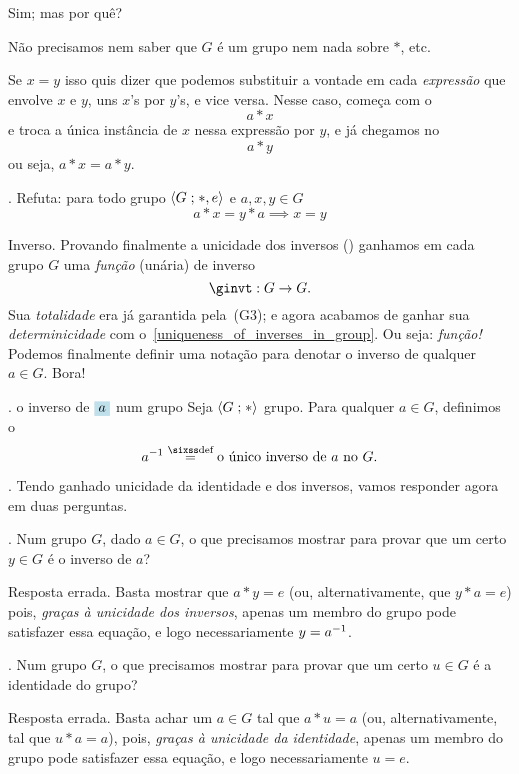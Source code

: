 \hint
Sim; mas por quê?

\hint
Não precisamos nem saber que $G$ é um grupo nem nada sobre $\ast$, etc.

\solution
Se $x=y$ isso quis dizer que podemos substituir a vontade em cada
\emph{expressão} que envolve $x$ e $y$, uns $x$'s por $y$'s, e vice versa.
Nesse caso, começa com o
$$
a \ast x
$$
e troca a única instância de $x$ nessa expressão por $y$, e já chegamos no
$$
a \ast y
$$
ou seja, $a \ast x = a \ast y$.

\endexercise

\exercise.
Refuta: para todo grupo $\langle{G}\mathrel{;}{\ast, e}\rangle$ e $a,x,y\in G$
$$
a\ast x = y\ast a \implies x=y
$$

\endexercise

\note Inverso.
\label{ginv_is_a_function}%
Provando finalmente a unicidade dos inversos
() ganhamos em cada grupo $G$ uma
\emph{função} (unária) de inverso
$$
\ginvt : G \to G.
$$
Sua \emph{totalidade} era já garantida pela~(G3);
e agora acabamos de ganhar sua \emph{determinicidade} com
o~\ref{uniqueness_of_inverses_in_group}.
Ou seja: \emph{função!}
Podemos finalmente definir uma notação para denotar o inverso de qualquer $a\in G$.
Bora!

.
\label{ginv}%
 {o inverso de $\holed a$ num grupo}
Seja $\langle{G}\mathrel{;}{\ast}\rangle$ grupo.  Para qualquer $a\in G$, definimos o
$$
\ginv a \defeq \text{o único inverso de $a$ no $G$}.
$$

\blah.
Tendo ganhado unicidade da identidade e dos inversos,
vamos responder agora em duas perguntas.

.
Num grupo $G$, dado $a\in G$,
o que precisamos mostrar para provar que um certo $y\in G$ é o inverso de $a$?

\note Resposta errada.
Basta mostrar que $a \ast y = e$
(ou, alternativamente, que $y \ast a = e$)
pois, \emph{graças à unicidade dos inversos},
apenas um membro do grupo pode satisfazer essa equação,
e logo necessariamente $y = {a}^{-1}$.

.
Num grupo $G$, o que precisamos mostrar para provar que um certo $u\in G$ é a identidade do grupo?

\note Resposta errada.
Basta achar um $a\in G$ tal que $a \ast u = a$
(ou, alternativamente, tal que $u \ast a = a$),
pois, \emph{graças à unicidade da identidade},
apenas um membro do grupo pode satisfazer essa equação,
e logo necessariamente $u = e$.

